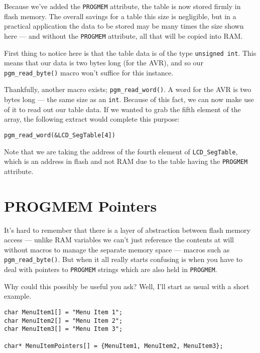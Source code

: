 \documentclass[a4paper,oneside,notitlepage]{book}
\begin{document}
Because we've added the \lstinline{PROGMEM} attribute, the table is now stored firmly in flash memory. The overall savings for a table this size is negligible, but in a practical application the data to be stored may be many times the size shown here --- and without the \lstinline{PROGMEM} attribute, all that will be copied into RAM.

First thing to notice here is that the table data is of the type \lstinline{unsigned int}. This means that our data is two bytes long (for the AVR), and so our \lstinline{pgm_read_byte()} macro won't suffice for this instance.

Thankfully, another macro exists; \lstinline{pgm_read_word()}. A word for the AVR is two bytes long --- the same size as an \lstinline{int}. Because of this fact, we can now make use of it to read out our table data. If we wanted to grab the fifth element of the array, the following extract would complete this purpose:

\begin{center}
\begin{lstlisting}
pgm_read_word(&LCD_SegTable[4])
\end{lstlisting}
\end{center}

Note that we are taking the address of the fourth element of \lstinline{LCD_SegTable}, which is an address in flash and not RAM due to the table having the \lstinline{PROGMEM} attribute.

\section{PROGMEM Pointers}

It's hard to remember that there is a layer of abstraction between flash memory access --- unlike RAM variables we can't just reference the contents at will without macros to manage the separate memory space --- macros such as \lstinline{pgm_read_byte()}. But when it all really starts confusing is when you have to deal with pointers to \lstinline{PROGMEM} strings which are also held in \lstinline{PROGMEM}.

Why could this possibly be useful you ask? Well, I'll start as usual with a short example.

\begin{center}
\begin{lstlisting}
char MenuItem1[] = "Menu Item 1";
char MenuItem2[] = "Menu Item 2";
char MenuItem3[] = "Menu Item 3";

char* MenuItemPointers[] = {MenuItem1, MenuItem2, MenuItem3};
\end{lstlisting}
\end{center}
\end{document}
